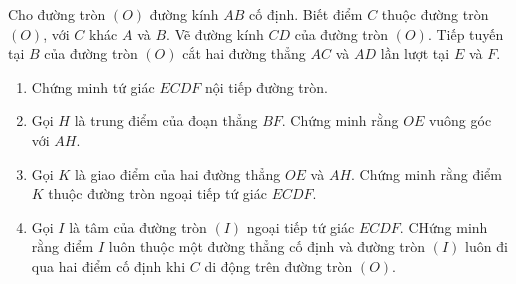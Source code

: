 \begin{ex}%
	Cho đường tròn $(O)$ đường kính $AB$ cố định. Biết điểm $C$ thuộc đường tròn $(O)$, với $C$ khác $A$ và $B$. Vẽ đường kính $CD$ của đường tròn $(O)$. Tiếp tuyến tại $B$ của đường tròn $(O)$ cắt hai đường thẳng $AC$ và $AD$ lần lượt tại $E$ và $F$.
	\begin{enumerate}
		\item Chứng minh tứ giác $ECDF$ nội tiếp đường tròn.
		\item Gọi $H$ là trung điểm của đoạn thẳng $BF$. Chứng minh rằng $OE$ vuông góc với $AH$.
		\item Gọi $K$ là giao điểm của hai đường thẳng $OE$ và $AH$. Chứng minh rằng điểm $K$ thuộc đường tròn ngoại tiếp tứ giác $ECDF$.
		\item Gọi $I$ là tâm của đường tròn $(I)$ ngoại tiếp tứ giác $ECDF$. CHứng minh rằng điểm $I$ luôn thuộc một đường thẳng cố định và đường tròn $(I)$ luôn đi qua hai điểm cố định khi $C$ di động trên đường tròn $(O)$.
		
	\end{enumerate}
\end{ex}
